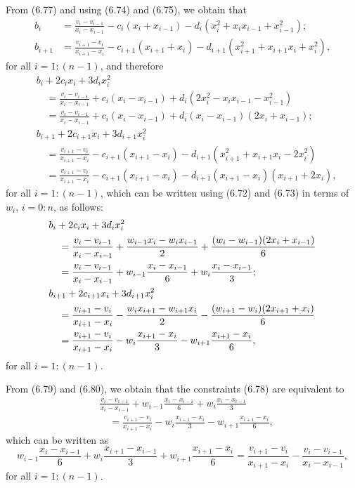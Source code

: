 From (6.77) and using (6.74) and (6.75), we obtain that
\begin{align*}
b_i &= \frac{v_i-v_{i-1}}{x_i-x_{i-1}} - c_i(x_i+x_{i-1}) -
d_i(x_i^2+x_ix_{i-1}+x_{i-1}^2); \\
b_{i+1} &= \frac{v_{i+1}-v_i}{x_{i+1}-x_i} - c_{i+1}(x_{i+1}+x_i) -
d_{i+1}(x_{i+1}^2+x_{i+1}x_i+x_i^2),
\end{align*}
for all $i = 1:(n-1)$, and therefore
\begin{align*}
& b_i + 2c_ix_i + 3d_ix_i^2 \\
&\quad= \frac{v_i-v_{i-1}}{x_i-x_{i-1}} + c_i(x_i-x_{i-1}) + d_i(2x_i^2-x_ix_{i-1}-x_{i-1}^2) \\
&\quad= \frac{v_i-v_{i-1}}{x_i-x_{i-1}} + c_i(x_i-x_{i-1}) + d_i(x_i-x_{i-1})(2x_i+x_{i-1}); \\
& b_{i+1}+2c_{i+1}x_i+3d_{i+1}x_i^2 \\
&\quad= \frac{v_{i+1}-v_i}{x_{i+1}-x_i} - c_{i+1}(x_{i+1}-x_i) - d_{i+1}(x_{i+1}^2+x_{i+1}x_i-2x_i^2) \\
&\quad= \frac{v_{i+1}-v_i}{x_{i+1}-x_i} - c_{i+1}(x_{i+1}-x_i) - d_{i+1}(x_{i+1}-x_i)(x_{i+1}+2x_i),
\end{align*}
for all $i = 1:(n-1)$, which can be written using (6.72) and (6.73) in terms of $w_i$,
$i = 0:n$, as follows:
\begin{align}
& b_i+2c_ix_i+3d_ix_i^2 \notag \\
&\quad= \frac{v_i-v_{i-1}}{x_i-x_{i-1}} + \frac{w_{i-1}x_i-w_ix_{i-1}}{2} +
\frac{(w_i-w_{i-1})(2x_i+x_{i-1})}{6} \notag \\
&\quad= \frac{v_i-v_{i-1}}{x_i-x_{i-1}} + w_{i-1}\frac{x_i-x_{i-1}}{6} +
w_i\frac{x_i-x_{i-1}}{3}; \\
& b_{i+1}+2c_{i+1}x_i+3d_{i+1}x_i^2 \notag \\
&\quad= \frac{v_{i+1}-v_i}{x_{i+1}-x_i} - \frac{w_ix_{i+1}-w_{i+1}x_i}{2} -
\frac{(w_{i+1}-w_i)(2x_{i+1}+x_i)}{6} \notag \\
&\quad= \frac{v_{i+1}-v_i}{x_{i+1}-x_i} - w_i\frac{x_{i+1}-x_i}{3} -
w_{i+1}\frac{x_{i+1}-x_i}{6},
\end{align}
for all $i = 1:(n-1)$.

From (6.79) and (6.80), we obtain that the constraints (6.78) are equivalent to
\begin{align*}
& \frac{v_i-v_{i-1}}{x_i-x_{i-1}} + w_{i-1}\frac{x_i-x_{i-1}}{6} + w_i\frac{x_i-x_{i-1}}{3} \\
&\quad= \frac{v_{i+1}-v_i}{x_{i+1}-x_i} - w_i\frac{x_{i+1}-x_i}{3} - w_{i+1}\frac{x_{i+1}-x_i}{6},
\end{align*}
which can be written as
\begin{equation}
w_{i-1}\frac{x_i-x_{i-1}}{6} + w_i\frac{x_{i+1}-x_{i-1}}{3} + w_{i+1}\frac{x_{i+1}-x_i}{6}
= \frac{v_{i+1}-v_i}{x_{i+1}-x_i} - \frac{v_i-v_{i-1}}{x_i-x_{i-1}},
\end{equation}
for all $i = 1:(n-1)$.

